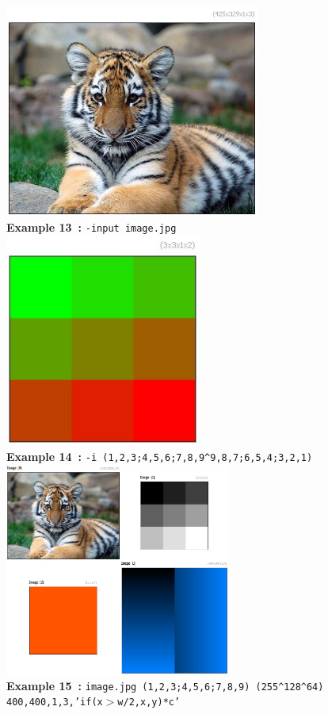 \documentclass[a4paper,11pt,twoside]{book}
\begin{document}
\begin{center}\includegraphics[keepaspectratio=true,height=7cm,width=\textwidth]{img/gmic_def13.jpg}\\
{\footnotesize \textbf{Example 13~:} \texttt{-input image.jpg}}
\\\includegraphics[keepaspectratio=true,height=7cm,width=\textwidth]{img/gmic_def14.jpg}\\
{\footnotesize \textbf{Example 14~:} \texttt{-i (1,2,3;4,5,6;7,8,9\textasciicircum 9,8,7;6,5,4;3,2,1)}}
\\\includegraphics[keepaspectratio=true,height=7cm,width=\textwidth]{img/gmic_def15.jpg}\\
{\footnotesize \textbf{Example 15~:} \texttt{image.jpg (1,2,3;4,5,6;7,8,9) (255\textasciicircum 128\textasciicircum 64) 400,400,1,3,'if(x$>$w/2,x,y)*c'}}
\end{center}
\end{document}
